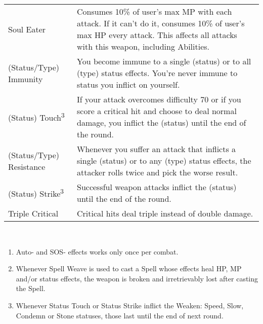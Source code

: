 \begin{table}[ht]
\begin{tabular}{p{}p{}}
        Soul Eater & Consumes 10\% of user’s max MP with each attack. If it can’t do it, consumes 10\% of user’s max HP every attack. This affects all attacks with this weapon, including Abilities. \\
        (Status/Type) Immunity & You become immune to a single (status) or to all (type) status effects. You're never immune to status you inflict on yourself. \\
        (Status) Touch\textsuperscript{3} & If your attack overcomes difficulty 70 or if you score a critical hit and choose to deal normal damage, you inflict the (status) until the end of the round. \\
        (Status/Type) Resistance & Whenever you suffer an attack that inflicts a single (status) or to any (type) status effects, the attacker rolls twice and pick the worse result. \\
        (Status) Strike\textsuperscript{3} & Successful weapon attacks inflict the (status) until the end of the round. \\
        Triple Critical & Critical hits deal triple instead of double damage. \\ \bottomrule
        \end{tabular} \\
\end{table}
\begin{footnotesize}
\begin{enumerate}
    \item Auto- and SOS- effects works only once per combat.
    \item Whenever Spell Weave is used to cast a Spell whose effects heal HP, MP and/or status effects, the weapon is broken and irretrievably lost after casting the Spell.
    \item Whenever Status Touch or Status Strike inflict the Weaken: Speed, Slow, Condemn or Stone statuses, those last until the end of next round.
\end{enumerate}
\end{footnotesize}